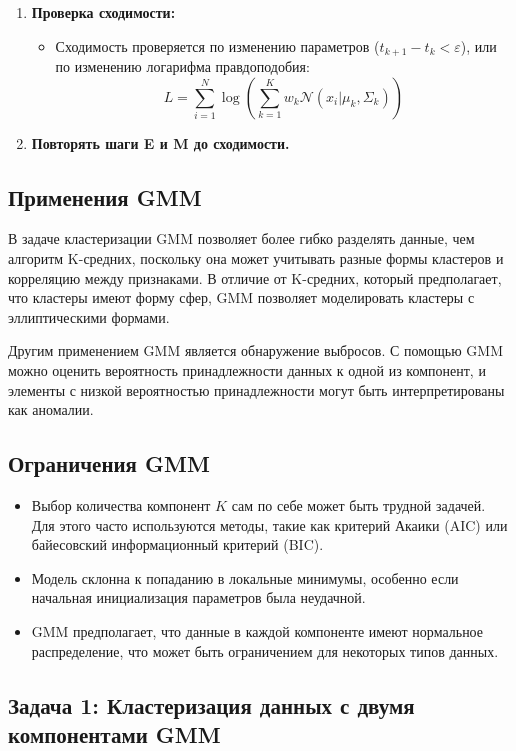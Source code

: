 \begin{enumerate}
    \item \textbf{Проверка сходимости:}
    \begin{itemize}
        \item Сходимость проверяется по изменению параметров ($t_{k+1} - t_k < \varepsilon$), или по изменению логарифма правдоподобия:
        \[
        L = \sum_{i=1}^{N} \log \left( \sum_{k=1}^{K} w_k \mathcal{N}(x_i | \mu_k, \Sigma_k) \right)
        \]

    \end{itemize}

    \item \textbf{Повторять шаги E и M до сходимости.}
\end{enumerate}


\subsection{Применения GMM}

В задаче кластеризации GMM позволяет более гибко разделять данные, чем алгоритм K-средних, поскольку она может учитывать разные формы кластеров и корреляцию между признаками. В отличие от K-средних, который предполагает, что кластеры имеют форму сфер, GMM позволяет моделировать кластеры с эллиптическими формами.

Другим применением GMM является обнаружение выбросов. С помощью GMM можно оценить вероятность принадлежности данных к одной из компонент, и элементы с низкой вероятностью принадлежности могут быть интерпретированы как аномалии.

\subsection{Ограничения GMM}

\begin{itemize}
    \item Выбор количества компонент $K$ сам по себе может быть трудной задачей. Для этого часто используются методы, такие как критерий Акаики (AIC) или байесовский информационный критерий (BIC).
    \item Модель склонна к попаданию в локальные минимумы, особенно если начальная инициализация параметров была неудачной.
    \item GMM предполагает, что данные в каждой компоненте имеют нормальное распределение, что может быть ограничением для некоторых типов данных.
\end{itemize}

\subsection{Задача 1: Кластеризация данных с двумя компонентами GMM}

